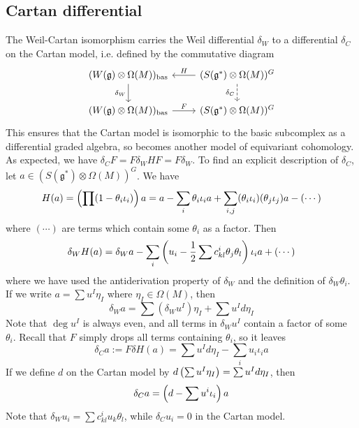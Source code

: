 \subsection{Cartan differential}
The Weil-Cartan isomorphism carries the Weil differential $\delta_W$ to a
differential $\delta_C$ on the Cartan model, i.e. defined by
the commutative diagram 
\[\begin{tikzcd}
		{(W(\mathfrak{g})\otimes\Omega(M))_{\text{bas}}} &
		{(S(\mathfrak{g}^*)\otimes\Omega(M))^G} \\
			{(W(\mathfrak{g})\otimes\Omega(M))_{\text{bas}}} &
			{(S(\mathfrak{g}^*)\otimes\Omega(M))^G}
				\arrow["{\delta_W}"', from=1-1, to=2-1]
					\arrow["{\delta_C}"', dashed, from=1-2, to=2-2]
						\arrow["H"', from=1-2, to=1-1]
							\arrow["F", from=2-1, to=2-2]
\end{tikzcd}\]
This ensures that the Cartan model is isomorphic to the basic subcomplex as a
differential graded algebra, so becomes another model of equivariant
cohomology. As expected, we have $\delta_C F = F\delta_W H F = F\delta_W$.
To find an explicit description of $\delta_C$, let 
$a\in (S(\mathfrak{g}^*)\otimes\Omega(M))^G$. We have
\[
H(a) = \paren{\prod(1-\theta_i \iota_i)} a
= a - \sum_i \theta_i \iota_i a + \sum_{i,j} (\theta_i\iota_i)(\theta_j\iota_j)a
- (\cdots)
\] 
where $(\cdots)$ are terms which contain some $\theta_i$ as a factor. 
Then 
\[
\delta_W H(a) = \delta_W a - \sum_{i} \paren{u_i - \frac{1}{2}\sum
c_{kl}^i\theta_j\theta_l}\iota_i a + (\cdots)
\] 
where we have used the antiderivation property of $\delta_W$ and the definition
of  $\delta_W\theta_i$.  If we write $a= \sum u^I \eta_I$ where  $\eta_I \in
\Omega(M)$, then 
 \[
\delta_W a = \sum (\delta_W u^I)\eta_I + \sum u^I d\eta_I
\] 
Note that $\deg u^I$ is always even, and all terms in $\delta_W u^I$ contain a
factor of some $\theta_i$. 
Recall that  $F$ simply drops all terms containing $\theta_i$, so it leaves
\begin{equation*}
	\delta_C a := F\delta H(a) = \sum u^I d\eta_I - \sum_i u_i \iota_i a
\end{equation*} 
If we define $d$ on the Cartan model by  $d \paren{\sum u^I \eta_I} = \sum u^I
d\eta_I$, then
\begin{equation}
	\delta_C a = \paren{d - \sum u^i \iota_i} a
\end{equation}
Note that $\delta_W u_i = \sum c_{kl}^iu_k\theta_l$, while 
$\delta_C u_i = 0$ in the Cartan model. 

